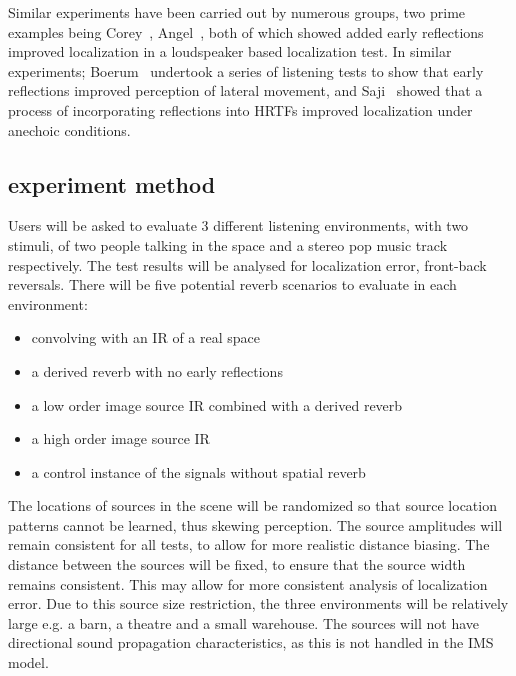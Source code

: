 \documentclass[paper=a4, fontsize=10pt, font=arial]{scrartcl} %
\numberwithin{equation}{section} %
\numberwithin{figure}{section} %
\numberwithin{table}{section} %
\begin{document}
 Similar experiments have been carried out by numerous groups, two prime examples being Corey~\cite{Corey2002}, Angel~\cite{Angel2002}, both of which showed added early reflections improved localization in a loudspeaker based localization test. In similar experiments; Boerum~\cite{Boerum2016} undertook a series of listening tests to show that early reflections improved perception of lateral movement, and Saji~\cite{Saji2009} showed that a process of incorporating reflections into HRTFs improved localization under anechoic conditions.

\subsection{experiment method}
Users will be asked to evaluate 3 different listening environments, with two stimuli, of two people talking in the space and a stereo pop music track respectively. The test results will be analysed for localization error, front-back reversals. There will be five potential reverb scenarios to evaluate in each environment: 
\begin{itemize}
\item convolving with an IR of a real space
\item a derived reverb with no early reflections 
\item a low order image source IR combined with a derived reverb
\item a high order image source IR
\item a control instance of the signals without spatial reverb
\end{itemize}
The locations of sources in the scene will be randomized so that source location patterns cannot be learned, thus skewing perception. The source amplitudes will remain consistent for all tests, to allow for more realistic distance biasing. The distance between the sources will be fixed, to ensure that the source width remains consistent. This may allow for more consistent analysis of localization error. Due to this source size restriction, the three environments will be relatively large e.g. a barn, a theatre and a small warehouse. The sources will not have directional sound propagation characteristics, as this is not handled in the IMS model.
\end{document}
